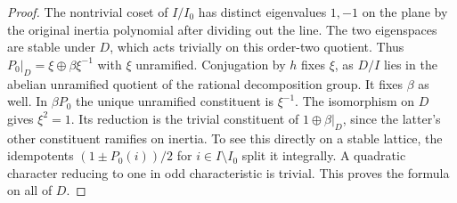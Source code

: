 \documentclass[a4paper,11pt]{article}
\theoremstyle{definition}
\theoremstyle{remark}
\numberwithin{equation}{section}
\begin{document}
\begin{proof}
The nontrivial coset of \(I/I_0\) has distinct eigenvalues
\(1,-1\) on the plane by the original inertia polynomial after
dividing out the line. The two eigenspaces are stable under \(D\),
which acts trivially on this order-two quotient. Thus
\(P_0|_D=\xi\oplus\beta\xi^{-1}\) with \(\xi\) unramified.
Conjugation by \(h\) fixes \(\xi\), as \(D/I\) lies in the abelian
unramified quotient of the rational decomposition group. It fixes
\(\beta\) as well. In \(\beta P_0\) the unique unramified
constituent is \(\xi^{-1}\). The isomorphism on \(D\) gives
\(\xi^2=1\). Its reduction is the trivial constituent of
\(1\oplus\beta|_D\), since the latter's other constituent
ramifies on inertia. To see this directly on a stable lattice,
the idempotents \((1\pm P_0(i))/2\) for \(i\in I\setminus I_0\)
split it integrally. A quadratic character reducing to one in
odd characteristic is trivial. This proves the formula on all of
\(D\).
\end{proof}
\end{document}
